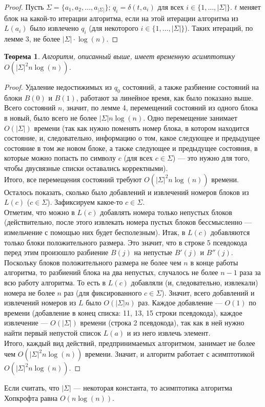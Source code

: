 \documentclass{article}
\newtheorem{theorem}{Теорема}
\begin{document}
\begin{proof}
  Пусть $\Sigma = \{a_1, a_2, \dots, a_{|\Sigma|}\}$; $q_i = \delta(t, a_i)$ для всех $i \in \{1, \dots, |\Sigma|\}$. $t$ меняет блок на какой-то итерации алгоритма, если на этой итерации алгоритма из $L(a_i)$ было извлечено $q_i$ (для некоторого $i \in \{1, \dots, |\Sigma|\}$). Таких итераций, по лемме 3, не более $|\Sigma| \cdot \log(n)$.
\end{proof}
\begin{theorem}
  Алгоритм, описанный выше, имеет временную асимптотику $O(|\Sigma|^2n\log(n))$.
\end{theorem}
\begin{proof}
  Удаление недостижимых из $q_0$ состояний, а также разбиение состояний на блоки $B(0)$ и $B(1)$, работают за линейное время, как было показано выше.\\
  Всего состояний $n$, значит, по лемме 4, перемещений состояний из одного блока в новый, было всего не более $|\Sigma| n \log(n)$. Одно перемещение занимает $O(|\Sigma|)$ времени (так как нужно поменять номер блока, в котором находится состояние, и, следовательно, информацию о том, какое следующее и предыдущее состояние в том же новом блоке, а также следующее и предыдущее состояния, в которые можно попасть по символу $c$ (для всех $c \in \Sigma$) --- это нужно для того, чтобы двусвязные списки оставались корректными).\\
  Итого, все перемещения состояний требуют $O(|\Sigma|^2n\log(n))$ времени.\\
  Осталось показать, сколько было добавлений и извлечений номеров блоков из $L(c)$ ($c \in \Sigma$). Зафиксируем какое-то $c \in \Sigma$.\\
  Отметим, что можно в $L(c)$ добавлять номера только непустых блоков (действительно, после этого извлекать номера пустых блоков бессмысленно --- измельчение с помощью них будет бесполезным). Итак, в $L(c)$ добавляются только блоки положительного размера. Это значит, что в строке 5 псевдокода перед этим произошло разбиение $B(j)$ на непустые $B'(j)$ и $B''(j)$. Поскольку блоков положительного размера не более чем $n$ в конце работы алгоритма, то разбиений блока на два непустых, случалось не более $n - 1$ раза за всю работу алгоритма. То есть в $L(c)$ добавляли (и, следовательно, извлекали) номера не более $n$ раз (для фиксированного $c \in \Sigma$). Значит, всего добавлений и извлечений номеров из $L$ было $O(|\Sigma| n)$ раз. Каждое добавление --- $O(1)$ по времени (добавление в конец списка: 11, 13, 15 строки псевдокода), каждое извлечение --- $O(|\Sigma|)$ времени (строка 2 псевдокода), так как в ней нужно найти первый непустой список $L(a)$ и из него извлечь элемент.\\
  Итого, каждый вид действий, предпринимаемых алгоритмом, занимает не более чем $O(|\Sigma|^2n\log(n))$ времени. Значит, и алгоритм работает с асимптотикой $O(|\Sigma|^2n\log(n))$.
\end{proof}
Если считать, что $|\Sigma|$ --- некоторая константа, то асимптотика алгоритма Хопкрофта равна $O(n\log(n))$.
\end{document}
